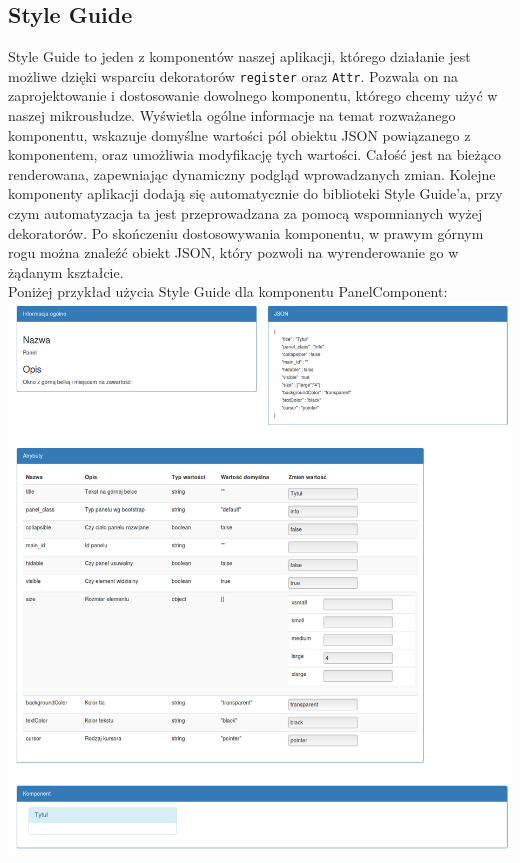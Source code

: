 \documentclass[licencjacka]{pracamgr}
\begin{document}
\subsection{Style Guide}
Style Guide to jeden z komponentów naszej aplikacji, którego działanie jest możliwe dzięki wsparciu dekoratorów \texttt{register} oraz \texttt{Attr}. 
Pozwala on na zaprojektowanie i dostosowanie dowolnego komponentu, którego chcemy użyć w naszej mikrousłudze. Wyświetla ogólne informacje na temat rozważanego komponentu, wskazuje domyślne wartości pól obiektu JSON powiązanego z komponentem, oraz umożliwia modyfikację tych wartości. 
Całość jest na bieżąco renderowana, zapewniając dynamiczny podgląd wprowadzanych zmian. Kolejne komponenty aplikacji dodają się automatycznie do biblioteki Style Guide'a, przy czym automatyzacja ta jest przeprowadzana za pomocą wspomnianych wyżej dekoratorów. 
Po skończeniu dostosowywania komponentu, w prawym górnym rogu można znaleźć obiekt JSON, który pozwoli na wyrenderowanie go w żądanym kształcie.\\

Poniżej przykład użycia Style Guide dla komponentu PanelComponent: \\
\includegraphics[width=\textwidth]{obrazki/styleguide.png}
\end{document}
